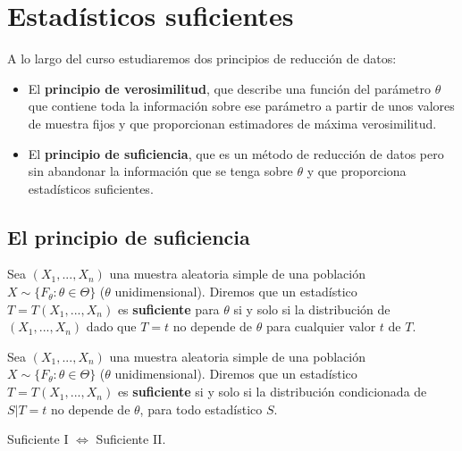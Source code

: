 \section{Estadísticos suficientes}

A lo largo del curso estudiaremos dos principios de reducción de datos:
\begin{itemize}
    \item El \textbf{principio de verosimilitud}, que describe una función del parámetro $\theta$ que contiene toda la información sobre ese parámetro a partir de unos valores de muestra fijos y que proporcionan estimadores de máxima verosimilitud.
    \item El \textbf{principio de suficiencia}, que es un método de reducción de datos pero sin abandonar la información que se tenga sobre $\theta$ y que proporciona estadísticos suficientes.
\end{itemize}

\subsection{El principio de suficiencia}

\begin{defi}[Suficiente I]
    Sea $(X_1,...,X_n)$ una muestra aleatoria simple de una población $X \sim \{F_{\theta} : \theta \in \Theta\}$ ($\theta$ unidimensional). Diremos que un estadístico $T = T(X_1,...,X_n)$ es \textbf{suficiente} para $\theta$ si y solo si la distribución de $(X_1,...,X_n)$ dado que $T = t$ no depende de $\theta$ para cualquier valor $t$ de $T$.
\end{defi}

\begin{defi}[Suficiente II]
    Sea $(X_1,...,X_n)$ una muestra aleatoria simple de una población $X \sim \{F_{\theta} : \theta \in \Theta\}$ ($\theta$ unidimensional). Diremos que un estadístico $T = T(X_1,...,X_n)$ es \textbf{suficiente} si y solo si la distribución condicionada de $S | T = t$ no depende de $\theta$, para todo estadístico $S$.
\end{defi}

\begin{prop}
    Suficiente I $\Longleftrightarrow$ Suficiente II.
\end{prop}

